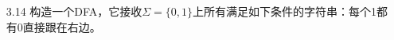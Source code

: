 \documentclass[]{ctexart}
\begin{document}
\begin{enumerate}
\begin{center}
	\end{center}
	
	\item[3.14] 构造一个DFA，它接收$\Sigma=\{0,1\}$上所有满足如下条件的字符串：每个1都有0直接跟在右边。
		
\end{enumerate}
\end{document}
